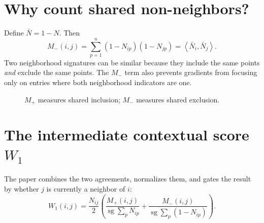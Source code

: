 \documentclass[11pt,oneside,openany]{book}
\theoremstyle{myplain}
\theoremstyle{definition}
\newcommand{\sg}{\operatorname{sg}}
\newcommand{\inner}[2]{\left\langle #1,#2\right\rangle}
\newcommand{\paperEq}[1]{\tag{P#1}}
\begin{document}
\section{Why count shared non-neighbors?}

Define $\bar N=1-N$. Then
\begin{equation}
  M_-(i,j)=\sum_{p=1}^{n}(1-N_{ip})(1-N_{jp})
  =\inner{\bar N_i}{\bar N_j}.
  \label{eq:mminus}
\end{equation}
Two neighborhood signatures can be similar because they include the same points \emph{and} exclude the same points. The $M_-$ term also prevents gradients from focusing only on entries where both neighborhood indicators are one.

\begin{figure}[H]
\centering
{}
\caption{$M_+$ measures shared inclusion; $M_-$ measures shared exclusion.}
\label{fig:mplus-mminus}
\end{figure}

\section{The intermediate contextual score $W_1$}

The paper combines the two agreements, normalizes them, and gates the result by whether $j$ is currently a neighbor of $i$:
\begin{equation*}
\boxed{
W_1(i,j)=\frac{N_{ij}}{2}
\left(
\frac{M_+(i,j)}{\sg\sum_p N_{ip}}
+
\frac{M_-(i,j)}{\sg\sum_p(1-N_{ip})}
\right).}
\paperEq{3}
\label{eq:w1}
\end{equation*}
\end{document}

